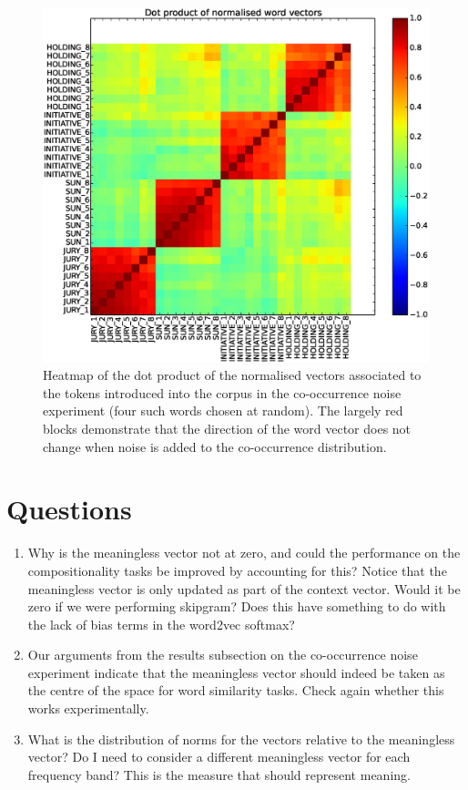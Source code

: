 \documentclass{article} %
\begin{document}
\begin{figure}[t!]
\includegraphics[scale=0.5]{cooccurrence-noise-heatmap}
\caption{
Heatmap of the dot product of the normalised vectors associated to the tokens introduced into the corpus in the co-occurrence noise experiment (four such words chosen at random).
The largely red blocks demonstrate that the direction of the word vector does not change when noise is added to the co-occurrence distribution.
}
\label{fig:cooccurrence-noise-heatmap}
\end{figure}

\section{Questions}
\begin{enumerate}
\item{ Why is the meaningless vector not at zero, and could the performance on the compositionality tasks be improved by accounting for this?  Notice that the meaningless vector is only updated as part of the context vector.  Would it be zero if we were performing skipgram? Does this have something to do with the lack of bias terms in the word2vec softmax?}
\item{Our arguments from the results subsection on the co-occurrence noise experiment indicate that the meaningless vector should indeed be taken as the centre of the space for word similarity tasks.  Check again whether this works experimentally.}
\item{What is the distribution of norms for the vectors relative to the meaningless vector?  Do I need to consider a different meaningless vector for each frequency band?  This is the measure that should represent meaning.}

\end{enumerate}

\footnotesize


\end{document}
